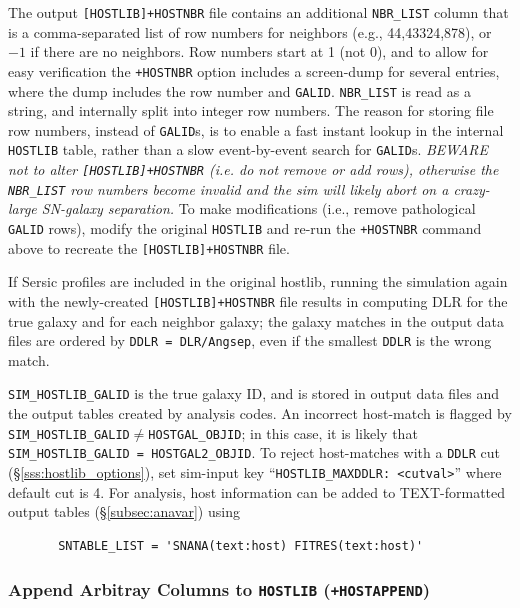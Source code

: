 \documentclass[12pt]{article}
\newcommand{\hostlib}{{\sc hostlib}}
\begin{document}
{The output \verb|[HOSTLIB]+HOSTNBR| file contains an additional 
\verb|NBR_LIST| column that is a comma-separated list of row numbers
for neighbors (e.g., 44,43324,878), or $-1$ if there are no neighbors.
%
Row numbers start at 1 (not 0), and to allow for easy verification
the {\tt +HOSTNBR} option includes a screen-dump for several entries, 
where the dump includes the row number and {\tt GALID}.
%
\verb|NBR_LIST| is read as a string, and internally split into integer
row numbers. The reason for storing file row numbers, instead of {\tt GALID}s,
is to enable a fast instant lookup in the internal {\tt HOSTLIB} table, 
rather than a slow event-by-event search for {\tt GALID}s.
{\it BEWARE not to alter \verb|[HOSTLIB]+HOSTNBR| (i.e. do not remove or add rows),
otherwise the \verb|NBR_LIST| row numbers become invalid and the sim
will likely abort on a crazy-large SN-galaxy separation.}
To make modifications (i.e., remove pathological {\tt GALID} rows),
modify the original {\tt HOSTLIB} and re-run the {\tt +HOSTNBR} command above
to recreate the \verb|[HOSTLIB]+HOSTNBR| file.


If Sersic profiles are included in the original \hostlib, 
running the simulation again with the 
newly-created \verb|[HOSTLIB]+HOSTNBR| file
results in computing DLR for the true galaxy and
for each neighbor galaxy; 
the galaxy matches in the output data files are ordered by
{\tt DDLR = DLR/Angsep}, 
even if the smallest {\tt DDLR} is the wrong match.


\verb|SIM_HOSTLIB_GALID| is the true galaxy ID, and is stored in 
output data files and the output tables created by analysis codes.
An incorrect host-match is flagged by
\verb|SIM_HOSTLIB_GALID|$\ne$\verb|HOSTGAL_OBJID|;
in this case, it is likely that
\verb|SIM_HOSTLIB_GALID = HOSTGAL2_OBJID|.
To reject host-matches with a {\tt DDLR} cut
(\S\ref{sss:hostlib_options}),
set sim-input key ``\verb|HOSTLIB_MAXDDLR: <cutval>|''  
where default cut is 4.
For analysis, host information can be added to TEXT-formatted
output tables (\S\ref{subsec:anavar}) using 
\begin{verbatim}
       SNTABLE_LIST = 'SNANA(text:host) FITRES(text:host)'
\end{verbatim}


\subsubsection{Append Arbitray Columns to {\tt HOSTLIB} ({\tt +HOSTAPPEND})}
\label{sss:hostlib_append}

}
\end{document}

